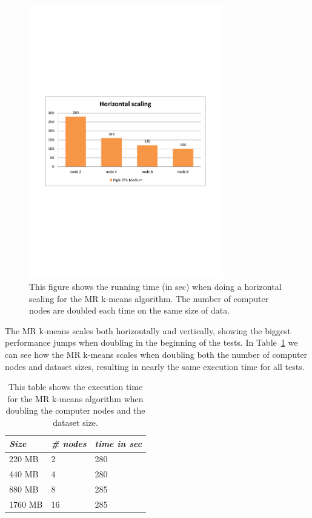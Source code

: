\begin{figure}[ht]
\centering
\includegraphics[trim = 10mm 90mm 10mm 90mm, clip, width=0.75\textwidth]{Figures/experiments/scale_horizontal.pdf}
\caption{This figure shows the running time (in sec) when doing a horizontal scaling for the MR k-means algorithm. The number of computer nodes are doubled each time on the same size of data. }
\label{fig:results_scalehorizontal}
\end{figure}

The MR k-means scales both horizontally and vertically, showing the biggest performance jumps when doubling in the beginning of the tests. In Table~\ref{tab:results_scale_scaling} we can see how the MR k-means scales when doubling both the number of computer nodes and dataset sizes, resulting in nearly the same execution time for all tests.

\begin{table}[h]
\centering
\begin{tabular}{| l | l | l |}
    \hline
    \textit{Size} & \textit{\# nodes} & \textit{time in sec} \\ \hline
    220 MB & 2 & 280  \\ \hline
    440 MB & 4 & 280  \\ \hline
    880 MB & 8 & 285 \\ \hline
    1760 MB & 16 & 285 \\ \hline
\end{tabular}
\caption{This table shows the execution time for the MR k-means algorithm when doubling the computer nodes and the dataset size.}
\label{tab:results_scale_scaling}
\end{table}


